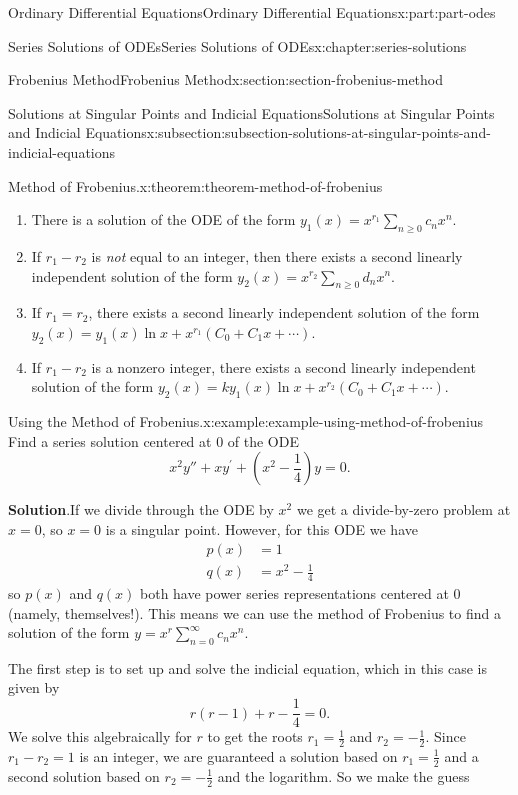 \documentclass[twoside,10pt,]{book}
\newcommand{\blocktitlefont}{\relax}
\numberwithin{equation}{part}
\newcommand{\amp}{&}
\begin{document}
\begin{partptx}{Ordinary Differential Equations}{}{Ordinary Differential Equations}{}{}{x:part:part-odes}
\begin{chapterptx}{Series Solutions of ODEs}{}{Series Solutions of ODEs}{}{}{x:chapter:series-solutions}
\begin{sectionptx}{Frobenius Method}{}{Frobenius Method}{}{}{x:section:section-frobenius-method}
\begin{subsectionptx}{Solutions at Singular Points and Indicial Equations}{}{Solutions at Singular Points and Indicial Equations}{}{}{x:subsection:subsection-solutions-at-singular-points-and-indicial-equations}
\begin{theorem}{Method of Frobenius.}{}{x:theorem:theorem-method-of-frobenius}
\begin{enumerate}
\item{}There is a solution of the ODE of the form \(y_{1}(x) = x^{r_{1}}\sum_{n\geq0}^{}c_{n}x^{n}\).%
\item{}If \(r_{1}-r_{2}\) is \emph{not} equal to an integer, then there exists a second linearly independent solution of the form \(y_{2}(x) = x^{r_{2}}\sum_{n\geq0}^{}d_{n}x^{n}\).%
\item{}If \(r_{1} = r_{2}\), there exists a second linearly independent solution of the form \(y_{2}(x) = y_{1}(x)\ln x + x^{r_{1}}(C_{0} + C_{1}x + \cdots )\).%
\item{}If \(r_{1} - r_{2}\) is a nonzero integer, there exists a second linearly independent solution of the form \(y_{2}(x) = ky_{1}(x)\ln x + x^{r_{2}}(C_{0} + C_{1}x + \cdots )\).%
\end{enumerate}
%
\end{theorem}
\begin{example}{Using the Method of Frobenius.}{x:example:example-using-method-of-frobenius}%
Find a series solution centered at \(0\) of the ODE%
\begin{equation*}
x^{2}y''+xy^\prime+(x^{2}-\frac{1}{4})y=0.
\end{equation*}
%
\par\smallskip%
\noindent\textbf{\blocktitlefont Solution}.\hypertarget{g:solution:idp105548817520160}{}\quad{}If we divide through the ODE by \(x^{2}\) we get a divide-by-zero problem at \(x=0\), so \(x=0\) is a singular point. However, for this ODE we have%
\begin{align*}
p(x) \amp= 1\\
q(x) \amp= x^{2}-\frac{1}{4}
\end{align*}
so \(p(x)\) and \(q(x)\) both have power series representations centered at \(0\) (namely, themselves!). This means we can use the method of Frobenius to find a solution of the form \(y = x^r\sum_{n=0}^{\infty}c_n x^n\).%
\par
The first step is to set up and solve the indicial equation, which in this case is given by%
\begin{equation*}
r(r-1)+r-\frac{1}{4} = 0.
\end{equation*}
We solve this algebraically for \(r\) to get the roots \(r_{1}=\frac{1}{2}\) and \(r_{2}=-\frac{1}{2}\). Since \(r_{1}-r_{2} = 1\) is an integer, we are guaranteed a solution based on \(r_{1} = \frac{1}{2}\) and a second solution based on \(r_{2} = -\frac{1}{2}\) and the logarithm. So we make the guess%

\end{example}
\end{subsectionptx}
\end{sectionptx}
\end{chapterptx}
\end{partptx}
\end{document}
